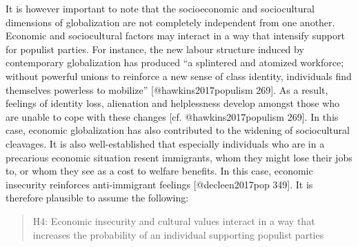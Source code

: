 \documentclass[]{article}
\begin{document}
It is however important to note that the socioeconomic and sociocultural
dimensions of globalization are not completely independent from one
another. Economic and sociocultural factors may interact in a way that
intensify support for populist parties. For instance, the new labour
structure induced by contemporary globalization has produced ``a
splintered and atomized workforce; without powerful unions to reinforce
a new sense of class identity, individuals find themselves powerless to
mobilize'' {[}@hawkins2017populism 269{]}. As a result, feelings of
identity loss, alienation and helplessness develop amongst those who are
unable to cope with these changes {[}cf. @hawkins2017populism 269{]}. In
this case, economic globalization has also contributed to the widening
of sociocultural cleavages. It is also well-established that especially
individuals who are in a precarious economic situation resent
immigrants, whom they might lose their jobs to, or whom they see as a
cost to welfare benefits. In this case, economic insecurity reinforces
anti-immigrant feelings {[}@decleen2017pop 349{]}. It is therefore
plausible to assume the following:

\begin{quote}
H4: Economic insecurity and cultural values interact in a way that
increases the probability of an individual supporting populist parties
\end{quote}
\end{document}

